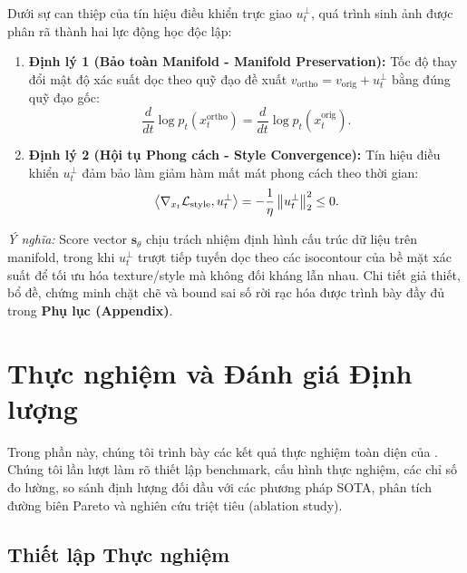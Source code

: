 \documentclass[runningheads]{llncs}
\begin{document}
Dưới sự can thiệp của tín hiệu điều khiển trực giao $u_t^\perp$, quá trình sinh ảnh được phân rã thành hai lực động học độc lập:
\begin{enumerate}
    \item \textbf{Định lý 1 (Bảo toàn Manifold - Manifold Preservation):} Tốc độ thay đổi mật độ xác suất dọc theo quỹ đạo đề xuất $v_{\text{ortho}} = v_{\text{orig}} + u_t^\perp$ bằng đúng quỹ đạo gốc:
    \begin{equation}
        \frac{d}{dt} \log p_t(x_t^{\text{ortho}}) = \frac{d}{dt} \log p_t(x_t^{\text{orig}}).
    \end{equation}
    \item \textbf{Định lý 2 (Hội tụ Phong cách - Style Convergence):} Tín hiệu điều khiển $u_t^\perp$ đảm bảo làm giảm hàm mất mát phong cách theo thời gian:
    \begin{equation}
        \left\langle \nabla_{x_t} \mathcal{L}_{\text{style}}, u_t^\perp \right\rangle = -\frac{1}{\eta} \left\lVert u_t^\perp\right\rVert_2^2 \le 0.
    \end{equation}
\end{enumerate}
\textit{Ý nghĩa:} Score vector $\mathbf{s}_\theta$ chịu trách nhiệm định hình cấu trúc dữ liệu trên manifold, trong khi $u_t^\perp$ trượt tiếp tuyến dọc theo các isocontour của bề mặt xác suất để tối ưu hóa texture/style mà không đối kháng lẫn nhau. Chi tiết giả thiết, bổ đề, chứng minh chặt chẽ và bound sai số rời rạc hóa được trình bày đầy đủ trong \textbf{Phụ lục (Appendix)}.

\section{Thực nghiệm và Đánh giá Định lượng}
\label{sec:experiments}

Trong phần này, chúng tôi trình bày các kết quả thực nghiệm toàn diện của \method. Chúng tôi lần lượt làm rõ thiết lập benchmark, cấu hình thực nghiệm, các chỉ số đo lường, so sánh định lượng đối đầu với các phương pháp SOTA, phân tích đường biên Pareto và nghiên cứu triệt tiêu (ablation study).

\subsection{Thiết lập Thực nghiệm}
\end{document}
